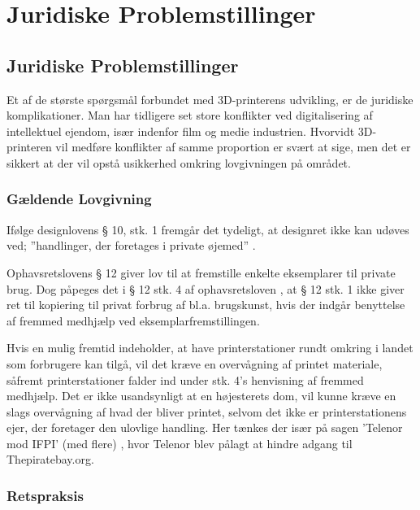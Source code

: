 \chapter{Juridiske Problemstillinger}

\section{Juridiske Problemstillinger}

Et af de største spørgsmål forbundet med 3D-printerens udvikling, er de juridiske komplikationer. Man har tidligere set store konflikter ved digitalisering af intellektuel ejendom, især indenfor film og medie industrien. Hvorvidt 3D-printeren vil medføre konflikter af samme proportion er svært at sige, men det er sikkert at der vil opstå usikkerhed omkring lovgivningen på området.

\subsection{Gældende Lovgivning}



Ifølge designlovens § 10, stk. 1 fremgår det tydeligt, at designret ikke kan udøves ved; ”handlinger, der foretages i private øjemed” \cite{_designloven_????}.

Ophavsretslovens § 12 giver lov til at fremstille enkelte eksemplarer til private brug.
Dog påpeges det i § 12 stk. 4 af ophavsretsloven \cite{jura2}, at § 12 stk. 1 ikke giver ret til kopiering til privat forbrug af bl.a. brugskunst, hvis der indgår benyttelse af fremmed medhjælp ved eksemplarfremstillingen.


Hvis en mulig fremtid indeholder, at have printerstationer rundt omkring i landet \cite{jura3} som forbrugere kan tilgå, vil det kræve en overvågning af printet materiale, såfremt printerstationer falder ind under stk. 4's henvisning af fremmed medhjælp. Det er ikke usandsynligt at en højesterets dom, vil kunne kræve en slags overvågning af hvad der bliver printet, selvom det ikke er printerstationens ejer, der foretager den ulovlige handling. Her tænkes der især på sagen ’Telenor mod IFPI’ (med flere) \cite{jura4}, hvor Telenor blev pålagt at hindre adgang til Thepiratebay.org.

\subsection{Retspraksis}


